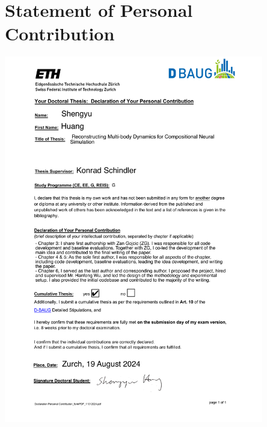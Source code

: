 \chapter{Statement of Personal Contribution}
\label{chap:contribution}
\noindent
\includegraphics[width=0.85\textwidth]{tex/10_Contribution.pdf}
